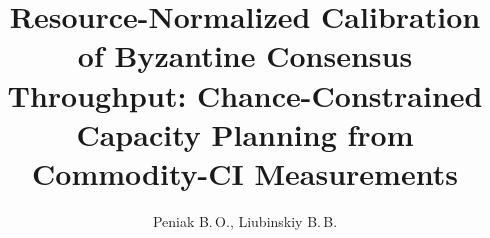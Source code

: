 \documentclass[12pt]{article}
\title[Resource-Normalized Calibration of BFT Consensus Throughput]{Resource-Normalized
Calibration of Byzantine Consensus Throughput: Chance-Constrained Capacity
Planning from Commodity-CI Measurements}
\author[Peniak B.\,O.]{Peniak B.\,O., Liubinskiy B.\,B.}
\begin{document}
\maketitle











\maketitleUkr
\end{document}
